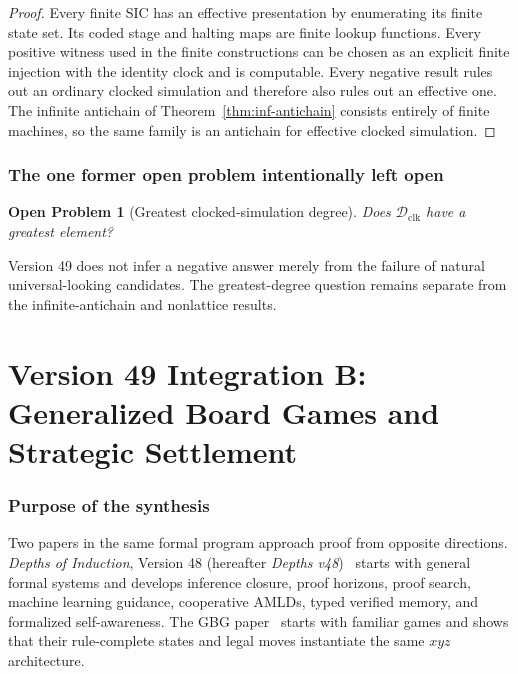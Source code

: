 \documentclass[11pt]{article}
\newtheorem{problem}[definition]{Open Problem}
\theoremstyle{remark}
\newcommand{\Dclk}{\mathcal D_{\mathrm{clk}}}
\begin{document}
\begin{proof}
Every finite SIC has an effective presentation by enumerating its finite state set.
Its coded stage and halting maps are finite lookup functions.
Every positive witness used in the finite constructions can be chosen as an explicit finite injection
with the identity clock and is computable.
Every negative result rules out an ordinary clocked simulation and therefore also rules out an
effective one.
The infinite antichain of Theorem~\ref{thm:inf-antichain} consists entirely of finite machines,
so the same family is an antichain for effective clocked simulation.
\end{proof}

\section{The one former open problem intentionally left open}

\begin{problem}[Greatest clocked-simulation degree]\label{prob:greatest}
Does \(\Dclk\) have a greatest element?
\end{problem}

Version 49 does not infer a negative answer merely from the failure of natural universal-looking
candidates.
The greatest-degree question remains separate from the infinite-antichain and nonlattice results.

\clearpage
\part*{Version 49 Integration B: Generalized Board Games and Strategic Settlement}


\section{Purpose of the synthesis}

Two papers in the same formal program approach proof from opposite directions. \emph{Depths of Induction}, Version 48 (hereafter \emph{Depths v48})~\cite{TennesonDepths48} starts with general formal systems and develops inference closure, proof horizons, proof search, machine learning guidance, cooperative AMLDs, typed verified memory, and formalized self-awareness. The GBG paper~\cite{TennesonGBG} starts with familiar games and shows that their rule-complete states and legal moves instantiate the same $xyz$ architecture.
\end{document}
